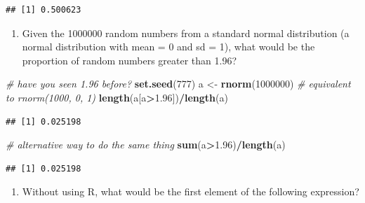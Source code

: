 \documentclass[]{book}
\newenvironment{Shaded}{\begin{snugshade}}{\end{snugshade}}
\newcommand{\CommentTok}[1]{\textcolor[rgb]{0.56,0.35,0.01}{\textit{#1}}}
\newcommand{\DecValTok}[1]{\textcolor[rgb]{0.00,0.00,0.81}{#1}}
\newcommand{\FloatTok}[1]{\textcolor[rgb]{0.00,0.00,0.81}{#1}}
\newcommand{\KeywordTok}[1]{\textcolor[rgb]{0.13,0.29,0.53}{\textbf{#1}}}
\newcommand{\NormalTok}[1]{#1}
\newcommand{\OperatorTok}[1]{\textcolor[rgb]{0.81,0.36,0.00}{\textbf{#1}}}
\newcommand{\StringTok}[1]{\textcolor[rgb]{0.31,0.60,0.02}{#1}}
\providecommand{\tightlist}{%
  \setlength{\itemsep}{0pt}\setlength{\parskip}{0pt}}
\begin{document}
\begin{verbatim}
## [1] 0.500623
\end{verbatim}

\begin{enumerate}
\def\labelenumi{\arabic{enumi}.}
\setcounter{enumi}{6}
\tightlist
\item
  Given the 1000000 random numbers from a standard normal distribution (a normal distribution with mean = 0 and sd = 1), what would be the proportion of random numbers greater than 1.96?
\end{enumerate}

\begin{Shaded}
\begin{Highlighting}[]
\CommentTok{# have you seen 1.96 before?}
\KeywordTok{set.seed}\NormalTok{(}\DecValTok{777}\NormalTok{)}
\NormalTok{a <-}\StringTok{ }\KeywordTok{rnorm}\NormalTok{(}\DecValTok{1000000}\NormalTok{) }\CommentTok{# equivalent to rnorm(1000, 0, 1)}
\KeywordTok{length}\NormalTok{(a[a}\OperatorTok{>}\FloatTok{1.96}\NormalTok{])}\OperatorTok{/}\KeywordTok{length}\NormalTok{(a)}
\end{Highlighting}
\end{Shaded}

\begin{verbatim}
## [1] 0.025198
\end{verbatim}

\begin{Shaded}
\begin{Highlighting}[]
\CommentTok{# alternative way to do the same thing}
\KeywordTok{sum}\NormalTok{(a}\OperatorTok{>}\FloatTok{1.96}\NormalTok{)}\OperatorTok{/}\KeywordTok{length}\NormalTok{(a)}
\end{Highlighting}
\end{Shaded}

\begin{verbatim}
## [1] 0.025198
\end{verbatim}

\begin{enumerate}
\def\labelenumi{\arabic{enumi}.}
\setcounter{enumi}{7}
\tightlist
\item
  Without using R, what would be the first element of the following expression?
\end{enumerate}

\begin{Shaded}
\end{Shaded}
\end{document}

